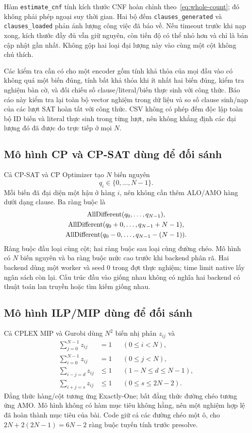 Hàm \texttt{estimate\_cnf} tính kích thước CNF hoàn chỉnh theo~\eqref{eq:whole-count}; đó không phải phép ngoại suy thời gian. Hai bộ đếm \texttt{clauses\_generated} và \texttt{clauses\_loaded} phản ánh lượng công việc đã báo về. Nếu timeout trước khi nạp xong, kích thước đầy đủ vẫn giữ nguyên, còn tiến độ có thể nhỏ hơn và chỉ là bản cập nhật gần nhất. Không gộp hai loại đại lượng này vào cùng một cột không chú thích.

Các kiểm tra cần có cho một encoder gồm tính khả thỏa của mọi đầu vào có không quá một biến đúng, tính bất khả thỏa khi ít nhất hai biến đúng, kiểm tra nghiệm bàn cờ, và đối chiếu số clause/literal/biến thực sinh với công thức. Báo cáo này kiểm tra lại toàn bộ vector nghiệm trong dữ liệu và so số clause sinh/nạp của các lượt SAT hoàn tất với công thức. CSV không có phép đếm độc lập toàn bộ ID biến và literal thực sinh trong từng lượt, nên không khẳng định các đại lượng đó đã được đo trực tiếp ở mọi $N$.

\subsection{Mô hình CP và CP-SAT dùng để đối sánh}
Cả CP-SAT và CP Optimizer tạo $N$ biến nguyên
\[
q_i\in\{0,\ldots,N-1\}.
\]
Mỗi biến đã đại diện một hậu ở hàng $i$, nên không cần thêm ALO/AMO hàng dưới dạng clause. Ba ràng buộc là
\begin{equation}
\begin{gathered}
\operatorname{AllDifferent}(q_0,\ldots,q_{N-1}),\\
\operatorname{AllDifferent}(q_0+0,\ldots,q_{N-1}+N-1),\\
\operatorname{AllDifferent}(q_0-0,\ldots,q_{N-1}-(N-1)).
\end{gathered}
\end{equation}
Ràng buộc đầu loại cùng cột; hai ràng buộc sau loại cùng đường chéo. Mô hình có $N$ biến nguyên và ba ràng buộc mức cao trước khi backend phân rã. Hai backend dùng một worker và seed 0 trong đợt thực nghiệm; time limit native lấy ngân sách còn lại. Cấu trúc đầu vào giống nhau không có nghĩa hai backend có thuật toán lan truyền hoặc tìm kiếm giống nhau.

\subsection{Mô hình ILP/MIP dùng để đối sánh}
Cả CPLEX MIP và Gurobi dùng $N^2$ biến nhị phân $z_{ij}$ và
\begin{align}
\sum_{j=0}^{N-1}z_{ij}&=1&&(0\le i<N),\\
\sum_{i=0}^{N-1}z_{ij}&=1&&(0\le j<N),\\
\sum_{i-j=d}z_{ij}&\le1&&(1-N\le d\le N-1),\\
\sum_{i+j=s}z_{ij}&\le1&&(0\le s\le2N-2).
\end{align}
Đẳng thức hàng/cột tương ứng Exactly-One; bất đẳng thức đường chéo tương ứng AMO. Mô hình không có hàm mục tiêu không hằng, nên một nghiệm hợp lệ đã hoàn thành mục tiêu của bài. Code giữ cả các đường chéo một ô, cho $2N+2(2N-1)=6N-2$ ràng buộc tuyến tính trước presolve.

